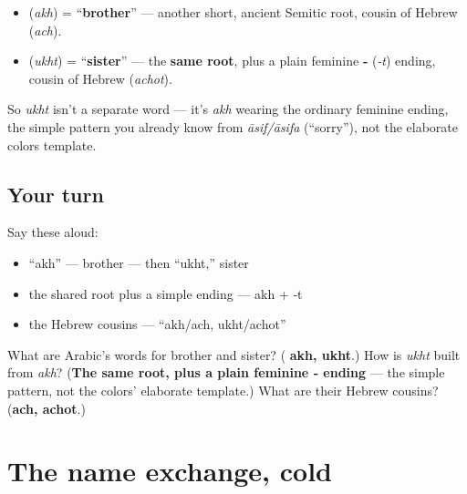 \begin{cousinweb}
\begin{itemize}
\raggedright
  \item \textbf{} (\emph{akh}) = \textquotedblleft{}\textbf{brother}\textquotedblright{} — another short, ancient Semitic root, cousin of Hebrew \textbf{} (\emph{ach}).
  \item \textbf{} (\emph{ukht}) = \textquotedblleft{}\textbf{sister}\textquotedblright{} — the \textbf{same root}, plus a plain feminine \textbf{‑} (\emph{‑t}) ending, cousin of Hebrew \textbf{} (\emph{achot}).
\end{itemize}

So \emph{ukht} isn't a separate word — it's \emph{akh} wearing the ordinary feminine ending, the simple pattern you already know from \emph{āsif/āsifa} (\textquotedblleft{}sorry\textquotedblright{}), not the elaborate colors template.
\end{cousinweb}

\subsection*{Your turn}
Say these aloud:

\begin{itemize}
\raggedright
  \item \textquotedblleft{}akh\textquotedblright{} — brother — then \textquotedblleft{}ukht,\textquotedblright{} sister
  \item the shared root plus a simple ending — akh + ‑t
  \item the Hebrew cousins — \textquotedblleft{}akh/ach, ukht/achot\textquotedblright{}
\end{itemize}

\begin{tcolorbox}[breakable,colback=teal!4,colframe=teal!35!black,title={Before you move on}]
What are Arabic's words for brother and sister? (\textbf{ akh,  ukht}.) How is \emph{ukht} built from \emph{akh}? (\textbf{The same root, plus a plain feminine ‑ ending} — the simple pattern, not the colors' elaborate template.) What are their Hebrew cousins? (\textbf{ach, achot}.)
\end{tcolorbox}
\section[\texorpdfstring{\ar{ما} \ar{اسمك؟} · \ar{اسمي} … (mā ismuka? · ismī …)}{ما اسمك؟ · اسمي … (mā ismuka? · ismī …)}]{The name exchange, cold}

